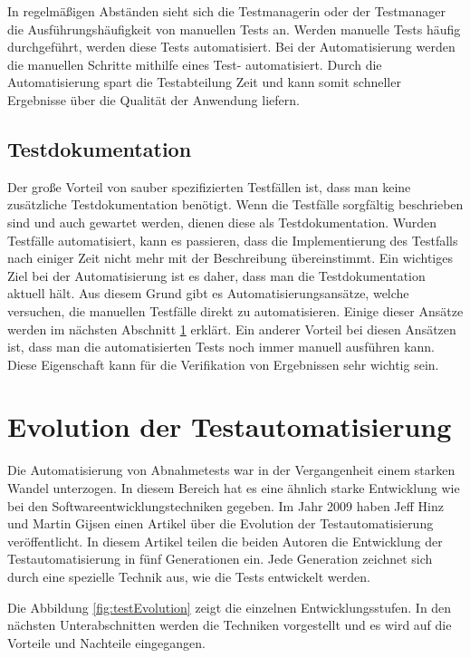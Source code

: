 In regelmäßigen Abständen sieht sich die Testmanagerin oder der Testmanager die Ausführungshäufigkeit von manuellen Tests an. Werden manuelle Tests häufig durchgeführt, werden diese Tests automatisiert. Bei der Automatisierung werden die manuellen Schritte mithilfe eines Test- automatisiert. Durch die Automatisierung spart die Testabteilung Zeit und kann somit schneller Ergebnisse über die Qualität der Anwendung liefern.

\subsection{Testdokumentation}

Der große Vorteil von sauber spezifizierten Testfällen ist, dass man keine zusätzliche Testdokumentation benötigt. Wenn die Testfälle sorgfältig beschrieben sind und auch gewartet werden, dienen diese als Testdokumentation. Wurden Testfälle automatisiert, kann es passieren, dass die Implementierung des Testfalls nach einiger Zeit nicht mehr mit der Beschreibung übereinstimmt. Ein wichtiges Ziel bei der Automatisierung ist es daher, dass man die Testdokumentation aktuell hält. Aus diesem Grund gibt es Automatisierungsansätze, welche versuchen, die manuellen Testfälle direkt zu automatisieren. Einige dieser Ansätze werden im nächsten Abschnitt \ref{cha:evolution} erklärt. Ein anderer Vorteil bei diesen Ansätzen ist, dass man die automatisierten Tests noch immer manuell ausführen kann. Diese Eigenschaft kann für die Verifikation von Ergebnissen sehr wichtig sein.

\section{Evolution der Testautomatisierung}
\label{cha:evolution}

Die Automatisierung von Abnahmetests war in der Vergangenheit einem starken Wandel unterzogen. In diesem Bereich hat es eine ähnlich starke Entwicklung wie bei den Softwareentwicklungstechniken gegeben. Im Jahr 2009 haben Jeff Hinz und Martin Gijsen einen Artikel \cite{Hinz09} über die Evolution der Testautomatisierung veröffentlicht. In diesem Artikel teilen die beiden Autoren die Entwicklung der Testautomatisierung in fünf Generationen ein. Jede Generation zeichnet sich durch eine spezielle Technik aus, wie die Tests entwickelt werden. 

\SuperPar
Die Abbildung \ref{fig:testEvolution} zeigt die einzelnen Entwicklungsstufen. In den nächsten Unterabschnitten werden die Techniken vorgestellt und es wird auf die Vorteile und Nachteile eingegangen.

